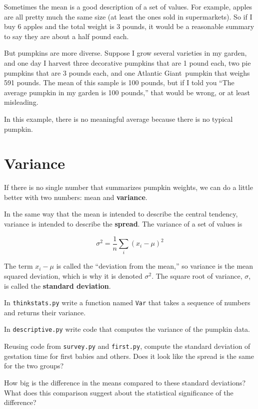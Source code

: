 \documentclass[12pt]{book}
\begin{document}
Sometimes the mean is a good description of a set of values.  For
example, apples are all pretty much the same size (at least the ones
sold in supermarkets).  So if I buy 6 apples and the total weight is 3
pounds, it would be a reasonable summary to say they are about a half
pound each.

But pumpkins are more diverse.  Suppose I grow several varieties in my
garden, and one day I harvest three decorative pumpkins that are 1
pound each, two pie pumpkins that are 3 pounds each, and one Atlantic
Giant\textregistered~pumpkin that weighs 591 pounds.  The mean of
this sample is 100 pounds, but if I told you ``The average pumpkin
in my garden is 100 pounds,'' that would be wrong, or at least
misleading.

In this example, there is no meaningful average because
there is no typical pumpkin.

\section{Variance}

If there is no single number that summarizes pumpkin weights,
we can do a little better with two numbers: mean and {\bf variance}.

In the same way that the mean is intended to describe the central
tendency, variance is intended to describe the {\bf spread}.
The variance of a set of values is

\[ \sigma^2 = \frac{1}{n} \sum_i (x_i - \mu)^2 \]

The term $x_i - \mu$ is called the ``deviation from the mean,'' so
variance is the mean squared deviation, which is why it is denoted
$\sigma^2$.  The square root of variance, $\sigma$, is called the {\bf
  standard deviation}.

\begin{ex}
In {\tt thinkstats.py} write a function named {\tt Var} that takes a
sequence of numbers and returns their variance.

In {\tt descriptive.py} write code that
computes the variance of the pumpkin data.
\end{ex}

\begin{ex}
Reusing code from {\tt survey.py} and {\tt first.py}, compute the
standard deviation of gestation time for first babies and others.
Does it look like the spread is the same for the two groups?
\end{ex}

\begin{ex}
How big is the difference in the means compared to these standard
deviations?  What does this comparison suggest about the statistical
significance of the difference?
\end{ex}
\end{document}
